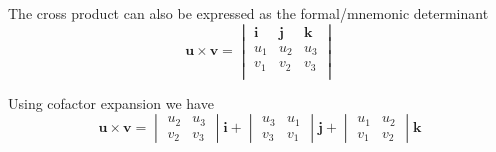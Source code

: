 The cross product can also be expressed as the formal/mnemonic  determinant 
\[\mathbf{u\times v} = \begin{vmatrix}
  \mathbf{i}&\mathbf{j}&\mathbf{k}\\
  u_1&u_2&u_3\\
  v_1&v_2&v_3\\
\end{vmatrix}
\]

Using cofactor expansion we have
\[\mathbf{u\times v} =
  \begin{vmatrix}
    u_2&u_3\\
    v_2&v_3
  \end{vmatrix}\mathbf{i} +
  \begin{vmatrix}
     u_3&u_1\\
     v_3&v_1
  \end{vmatrix}\mathbf{j} +
  \begin{vmatrix}
    u_1&u_2\\
    v_1&v_2
  \end{vmatrix}\mathbf{k}
\]




